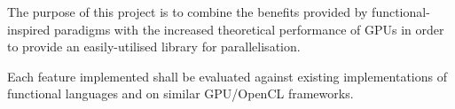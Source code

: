 The purpose of this project is to combine the benefits provided by functional-inspired paradigms with the increased theoretical performance of \ac{GPUs} in order to provide an easily-utilised library for parallelisation.

Each feature implemented shall be evaluated against existing implementations of functional languages and on similar GPU/\ac{OpenCL} frameworks.
